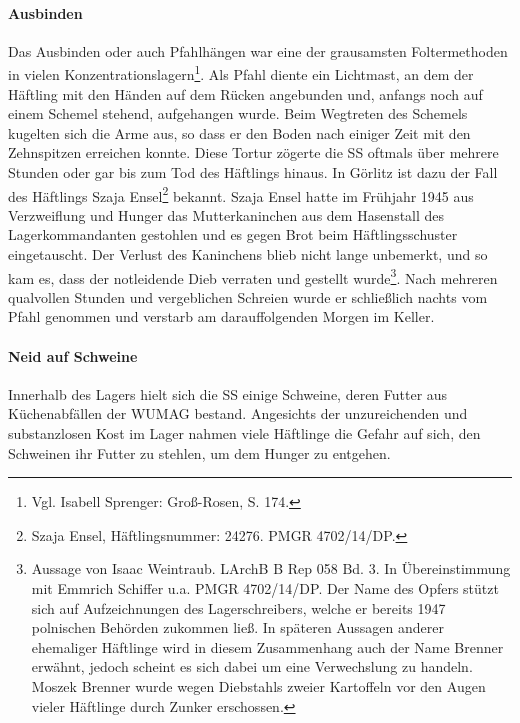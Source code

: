 \documentclass[a4paper,12pt,ngerman,
]{nisebook}
\begin{document}
\paragraph{Ausbinden}
Das Ausbinden oder auch Pfahlhängen war eine der grausamsten Foltermethoden in vielen Konzentrationslagern\footnote{Vgl. Isabell Sprenger: Groß-Rosen, S. 174.}. Als Pfahl diente ein Lichtmast, an dem der Häftling mit den Händen auf dem Rücken angebunden und, anfangs noch auf einem Schemel stehend, aufgehangen wurde. Beim Wegtreten des Schemels kugelten sich die Arme aus, so dass er den Boden nach einiger Zeit mit den Zehnspitzen erreichen konnte. Diese Tortur zögerte die SS oftmals über mehrere Stunden oder gar bis zum Tod des Häftlings hinaus.
\newline
In Görlitz ist dazu der Fall des Häftlings \mbox{Szaja} \mbox{Ensel}\footnote{Szaja Ensel, Häftlingsnummer: 24276. PMGR 4702/14/DP.} bekannt. Szaja Ensel hatte im Frühjahr 1945 aus Verzweiflung und Hunger das Mutterkaninchen aus dem Hasenstall des Lagerkommandanten gestohlen und es gegen Brot beim Häftlingsschuster eingetauscht. Der Verlust des Kaninchens blieb nicht lange unbemerkt, und so kam es, dass der notleidende Dieb verraten und gestellt wurde\footnote{Aussage von Isaac Weintraub. LArchB B Rep 058 Bd. 3. In Übereinstimmung mit Emmrich Schiffer u.a. PMGR 4702/14/DP. Der Name des Opfers stützt sich auf Aufzeichnungen des Lagerschreibers, welche er bereits 1947 polnischen Behörden zukommen ließ. In späteren Aussagen anderer ehemaliger Häftlinge wird in diesem Zusammenhang auch der Name Brenner erwähnt, jedoch scheint es sich dabei um eine Verwechslung zu handeln. Moszek Brenner wurde wegen Diebstahls zweier Kartoffeln vor den Augen vieler Häftlinge durch Zunker erschossen.}.
Nach mehreren qualvollen Stunden und vergeblichen Schreien wurde er schließlich nachts vom Pfahl genommen und verstarb am darauffolgenden Morgen im Keller.
~\newline

\paragraph{Neid auf Schweine}
\label{schweine}
Innerhalb des Lagers hielt sich die SS einige Schweine, deren Futter aus Küchenabfällen der WUMAG bestand. Angesichts der unzureichenden und substanzlosen Kost im Lager nahmen viele Häftlinge die Gefahr auf sich, den Schweinen ihr Futter zu stehlen, um dem Hunger zu entgehen.
\end{document}
